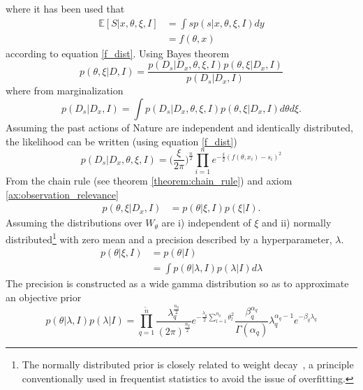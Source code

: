 	where it has been used that
	\begin{equation}
		\begin{split}
			\mathbb{E}[S|x,\theta,\xi,I] &= \int s p(s|x,\theta,\xi,I) dy\\
			&= f(\theta,x)
		\end{split}
	\end{equation}
	according to equation \eqref{f_dist}. Using Bayes theorem
	\begin{equation}
		p(\theta,\xi|D,I) = \frac{p(D_s|D_x,\theta,\xi,I)p(\theta,\xi|D_x,I)}{p(D_s|D_x,I)}
		\label{eq:bayes2}
	\end{equation}
	where from marginalization
	\begin{equation}
		p(D_s|D_x,I) = \int p(D_s|D_x,\theta,\xi,I)p(\theta,\xi|D_x,I) d\theta d\xi.
	\end{equation}
	Assuming the past actions of Nature are independent and identically distributed, the likelihood can be written (using equation \eqref{f_dist})
	\begin{equation}
		p(D_s|D_x,\theta,\xi,I) = \bigg(\frac{\xi}{2\pi}\bigg)^\frac{n}{2}\prod_{i=1}^n e^{-\frac{\xi}{2}(f(\theta,x_i)-s_i)^2}
		\label{reg:likelihood}
	\end{equation}
	From the chain rule (see theorem \ref{theorem:chain_rule}) and axiom \ref{ax:observation_relevance}
	\begin{equation}
		\begin{split}
			p(\theta,\xi|D_x,I) &= p(\theta|\xi,I)p(\xi|I).
		\end{split}
	\end{equation}
	Assuming the distributions over $W_\theta$ are i) independent of $\xi$ and ii) normally distributed\footnote{The normally distributed prior is closely related to weight decay~\citep{Plaut1986}, a principle conventionally used in frequentist statistics to avoid the issue of overfitting.} with zero mean and a precision described by a hyperparameter, $\lambda$. 	 
	\begin{equation}
		\begin{split}
			p(\theta|\xi,I) & = p(\theta|I)\\
			& = \int p(\theta|\lambda,I)p(\lambda|I)d\lambda
		\end{split}
		\label{eq:prior1}
	\end{equation}
	The precision is constructed as a wide gamma distribution so as to approximate an objective prior
	\begin{equation}
			p(\theta|\lambda,I)p(\lambda|I)
			= \prod_{q=1}^{\tilde{n}} \frac{\lambda_q^\frac{n_q}{2}}{(2\pi)^\frac{n_q}{2}}e^{-\frac{\lambda_q}{2}\sum_{l=1}^{n_q}\theta_l^2}\frac{\beta_q^{\alpha_q}}{\Gamma(\alpha_q)}\lambda_q^{\alpha_q-1}e^{-\beta_q \lambda_q}
		\label{eq:prior}
	\end{equation}
